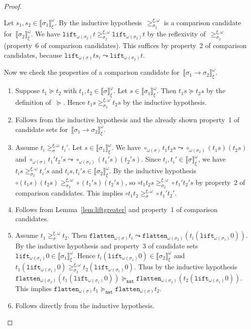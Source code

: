 \documentclass[a4paper,UKenglish,cleveref,autoref,numberwithinsect]{lipics-v2019}
\theoremstyle{definition}
\newcommand{\arrtype}{\rightarrow}
\newcommand{\nat}{\mathtt{nat}}
\newcommand{\flatten}{\mathtt{flatten}}
\newcommand{\lift}{\mathtt{lift}}
\newcommand{\val}[3]{\ensuremath{\llbracket#1\rrbracket_{#2}^{#3}}}
\newcommand{\gteq}[3]{\ensuremath{\ge_{#1}^{#2,#3}}}
\begin{document}
\begin{proof}
\begin{enumerate}
    Let $s_1,s_2 \in \val{\sigma_1}{\xi}{\omega}$. By the inductive
    hypothesis~$\gteq{\sigma_2}{\xi}{\omega}$ is a comparison
    candidate for~$\val{\sigma_2}{\xi}{\omega}$. We have
    $\lift_{\omega(\sigma_2)} t \gteq{\sigma_2}{\xi}{\omega}
    \lift_{\omega(\sigma_2)} t$ by the reflexivity
    of~$\gteq{\sigma_2}{\xi}{\omega}$ (property~6 of comparison
    candidates). This suffices by property~2 of comparison candidates,
    because $\lift_{\omega(\sigma)}t s_i \leadsto
    \lift_{\omega(\sigma_2)} t$.
  \end{enumerate}
  Now we check the properties of a comparison candidate
  for~$\val{\sigma_1\arrtype\sigma_2}{\xi}{\omega}$.
  \begin{enumerate}
  \item Suppose $t_1 \succeq t_2$ with $t_1,t_2 \in
    \val{\sigma}{\xi}{\omega}$. Let $s \in
    \val{\sigma_1}{\xi}{\omega}$. Then $t_1 s \succeq t_2 s$ by the
    definition of~$\succeq$. Hence $t_1 s \gteq{\sigma_2}{\xi}{\omega}
    t_2 s$ by the inductive hypothesis.
  \item Follows from the inductive hypothesis and the already shown
    property~1 of candidate sets
    for~$\val{\sigma_1\arrtype\sigma_2}{\xi}{\omega}$.
  \item Assume $t_i \gteq{\sigma}{\xi}{\omega} t_i'$. Let $s \in
    \val{\sigma_1}{\xi}{\omega}$. We have $\circ_{\omega(\sigma)} t_1
    t_2 s \leadsto \circ_{\omega(\sigma_2)} (t_1 s) (t_2 s)$ and
    $\circ_{\omega(\sigma)} t_1' t_2' s \leadsto
    \circ_{\omega(\sigma_2)} (t_1' s) (t_2' s)$. Since
    $t_i,t_i'\in\val{\sigma}{\xi}{\omega}$, we have $t_i s
    \gteq{\sigma_2}{\xi}{\omega} t_i' s$ and $t_i s, t_i' s \in
    \val{\sigma_2}{\xi}{\omega}$. By the inductive hypothesis $\circ
    (t_1 s) (t_2 s) \gteq{\sigma_2}{\xi}{\omega} \circ (t_1' s) (t_2'
    s)$, so $\circ t_1 t_2 s \gteq{\sigma_2}{\xi}{\omega} \circ t_1'
    t_2' s$ by property~2 of comparison candidates. This implies
    $\circ t_1 t_2 \gteq{\sigma}{\xi}{\omega} \circ t_1' t_2'$.
  \item Follows from Lemma~\ref{lem:liftgreater} and property~1 of
    comparison candidates.
  \item Assume $t_1 \gteq{\sigma}{\xi}{\omega} t_2$. Then
    $\flatten_{\omega(\sigma)} t_i \leadsto
    \flatten_{\omega(\sigma_2)} (t_i (\lift_{\omega(\sigma_1)}0))$. By
    the inductive hypothesis and property~3 of candidate sets
    $\lift_{\omega(\sigma_1)}0 \in \val{\sigma_1}{\xi}{\omega}$. Hence
    $t_i (\lift_{\omega(\sigma_1)}0) \in \val{\sigma_2}{\xi}{\omega}$
    and $t_1 (\lift_{\omega(\sigma_1)}0) \gteq{\sigma_2}{\xi}{\omega}
    t_2 (\lift_{\omega(\sigma_1)}0)$. Thus by the inductive hypothesis
    $\flatten_{\omega(\sigma_2)} (t_1 (\lift_{\omega(\sigma_1)}0))
    \succeq_\nat \flatten_{\omega(\sigma_2)} (t_2
    (\lift_{\omega(\sigma_1)}0))$. This implies
    $\flatten_{\omega(\sigma)} t_1 \succeq_\nat
    \flatten_{\omega(\sigma)} t_2$.
  \item Follows directly from the inductive hypothesis.
  \end{enumerate}


\end{proof}
\end{document}
